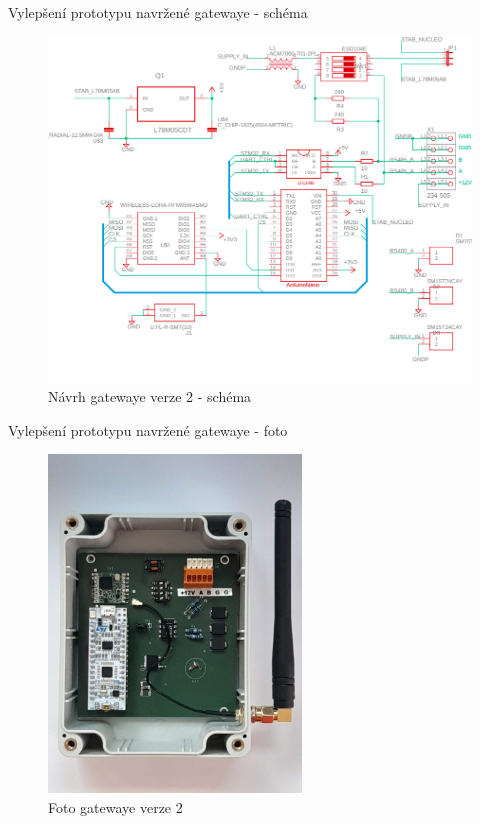 \documentclass{beamer}
\begin{document}
\begin{frame}{Vylepšení prototypu navržené gatewaye - schéma}
	\begin{figure}[!h]
		\centering
		\includegraphics[width=1\textwidth]{minigateway_schema}
		\caption{Návrh gatewaye verze 2 - schéma}
		\label{fig:minigateway_schema}
	\end{figure}
\end{frame}



\begin{frame}{Vylepšení prototypu navržené gatewaye - foto}
	\begin{figure}[!h]
		\centering
		\includegraphics[width=0.6\textwidth]{photo_minigatewayV2}
		\caption{Foto gatewaye verze 2}
		\label{fig:minigateway_fotoV2}
	\end{figure}
\end{frame}
\end{document}
